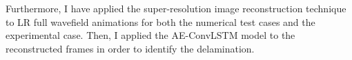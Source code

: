 
Furthermore, I have applied the super-resolution image reconstruction technique to LR full wavefield animations for both the numerical test cases and the experimental case. 
Then, I applied the AE-ConvLSTM model to the reconstructed frames in order to identify the delamination.

